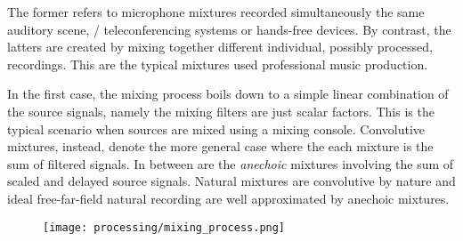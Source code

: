 The former refers to microphone mixtures recorded simultaneously the same auditory scene, \eg/ teleconferencing systems or hands-free devices.
By contrast, the latters are created by mixing together different individual, possibly processed, recordings.
This are the typical mixtures used professional music production.

In the first case, the mixing process boils down to a simple linear combination of the source signals, namely
the mixing filters are just scalar factors.
This is the typical scenario when sources are mixed using a mixing console.
Convolutive mixtures, instead, denote the more general case where the each mixture is the sum of filtered signals.
In between are the \textit{anechoic} mixtures involving the sum of scaled and delayed source signals.
Natural mixtures are convolutive by nature and ideal free-far-field natural recording are well approximated by anechoic mixtures.

\begin{figure}[t]
    \begin{fullwidthfig}
        \texttt{[image: processing/mixing\_process.png]}
    \end{fullwidthfig}

    \vspace{-\baselineskip}\vspace{-\baselineskip}
    \label{fig:processing:mixing}
\end{figure}

